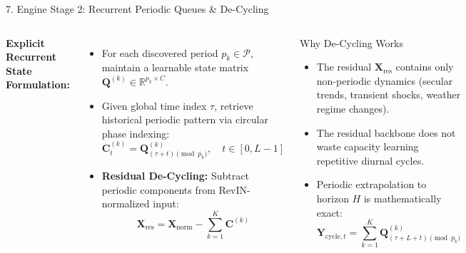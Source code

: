 \documentclass[aspectratio=169, 10pt]{beamer}
\begin{document}
\begin{frame}{7. Engine Stage 2: Recurrent Periodic Queues \& De-Cycling}
\begin{columns}[T]
\textbf{Explicit Recurrent State Formulation:}
\begin{itemize}
    \item For each discovered period $p_k \in \mathcal{P}$, maintain a learnable state matrix $\mathbf{Q}^{(k)} \in \mathbb{R}^{p_k \times C}$.
    \item Given global time index $\tau$, retrieve historical periodic pattern via circular phase indexing:
    \begin{equation*}
        \mathbf{C}^{(k)}_t = \mathbf{Q}^{(k)}_{(\tau + t) \pmod{p_k}}, \quad t \in [0, L-1]
    \end{equation*}
    \item \textbf{Residual De-Cycling:} Subtract periodic components from RevIN-normalized input:
    \begin{equation*}
        \mathbf{X}_{\text{res}} = \mathbf{X}_{\text{norm}} - \sum_{k=1}^K \mathbf{C}^{(k)}
    \end{equation*}
\end{itemize}

\begin{block}{Why De-Cycling Works}
\begin{itemize}
    \item The residual $\mathbf{X}_{\text{res}}$ contains only non-periodic dynamics (secular trends, transient shocks, weather regime changes).
    \item The residual backbone does not waste capacity learning repetitive diurnal cycles.
    \item Periodic extrapolation to horizon $H$ is mathematically exact:
    $$\mathbf{Y}_{\text{cycle}, t} = \sum_{k=1}^K \mathbf{Q}^{(k)}_{(\tau + L + t) \pmod{p_k}}$$
\end{itemize}
\end{block}
\end{columns}
\end{frame}
\end{document}
